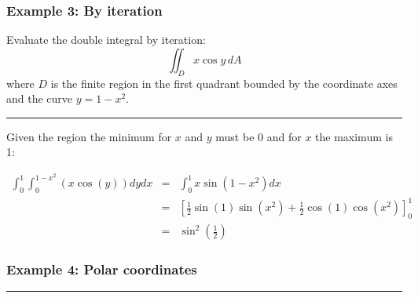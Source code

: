 \subsubsection{Example 3: By iteration}
Evaluate the double integral by iteration:
$$\iint_{D}x\cos y\,d A$$
where $D$ is the finite region in the first quadrant bounded by the coordinate axes and the curve
$y=1-x^2$.

\noindent\rule{\textwidth}{1pt}

Given the region the minimum for $x$ and $y$ must be $0$ and for $x$ the maximum is 1:

\begin{eqnarray*}
  \int_{0}^{1}\int_{0}^{1-x^2}(x\cos(y))dydx&=&\int_{0}^{1}x \sin \left(1-x^2\right)dx\\
                                            &=&\left[\frac{1}{2} \sin (1) \sin \left(x^2\right)+\frac{1}{2} \cos (1) \cos \left(x^2\right)\right]^1_0\\
                                            &=&\boxed{\sin ^2\left(\frac{1}{2}\right)}
\end{eqnarray*}

\subsubsection{Example 4: Polar coordinates}

\noindent\rule{\textwidth}{1pt}


